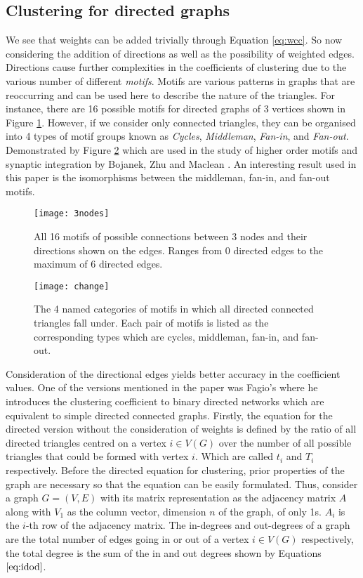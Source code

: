 \subsection{Clustering for directed graphs}

We see that weights can be added trivially through Equation \ref{eq:wcc}. So now considering the addition of directions as well as the possibility of weighted edges. Directions cause further complexities in the coefficients of clustering due to the various number of different \emph{motifs}. Motifs are various patterns in graphs that are reoccurring and can be used here to describe the nature of the triangles. For instance, there are 16 possible motifs for directed graphs of 3 vertices shown in Figure \ref{fig:3nodes}. However, if we consider only connected triangles, they can be organised into 4 types of motif groups known as \emph{Cycles}, \emph{Middleman}, \emph{Fan-in}, and \emph{Fan-out}. Demonstrated by Figure \ref{fig:change} which are used in the study of higher order motifs and synaptic integration by Bojanek, Zhu and Maclean \cite{synaptic}. An interesting result used in this paper is the isomorphisms between the middleman, fan-in, and fan-out motifs.

\begin{figure}[!htb]
	\centering
	\texttt{[image: 3nodes]}
	\caption{All 16 motifs of possible connections between 3 nodes and their directions shown on the edges. Ranges from 0 directed edges to the maximum of 6 directed edges.}
	\label{fig:3nodes}
\end{figure}

\begin{figure}[!htb]
	\centering
	\texttt{[image: change]}
	\caption{The 4 named categories of motifs in which all directed connected triangles fall under. Each pair of motifs is listed as the corresponding types which are cycles, middleman, fan-in, and fan-out.}
	\label{fig:change}
\end{figure}

Consideration of the directional edges yields better accuracy in the coefficient values. One of the versions mentioned in the paper \cite{PhysRevResearch.3.043124} was Fagio's where he introduces the clustering coefficient to binary directed networks which are equivalent to simple directed connected graphs. Firstly, the equation for the directed version without the consideration of weights is defined by the ratio of all directed triangles centred on a vertex $i \in V(G)$ over the number of all possible triangles that could be formed with vertex $i$. Which are called $t_{i}$ and $T_{i}$ respectively. Before the directed equation for clustering, prior properties of the graph are necessary so that the equation can be easily formulated. Thus, consider a graph $G = (V, E)$ with its matrix representation as the adjacency matrix $A$ along with $V_1$ as the column vector, dimension $n$ of the graph, of only 1s. $A_i$ is the $i$-th row of the adjacency matrix. The in-degrees and out-degrees of a graph are the total number of edges going in or out of a vertex $i\in V(G)$ respectively, the total degree is the sum of the in and out degrees shown by Equations $\ref{eq:idod}$.

